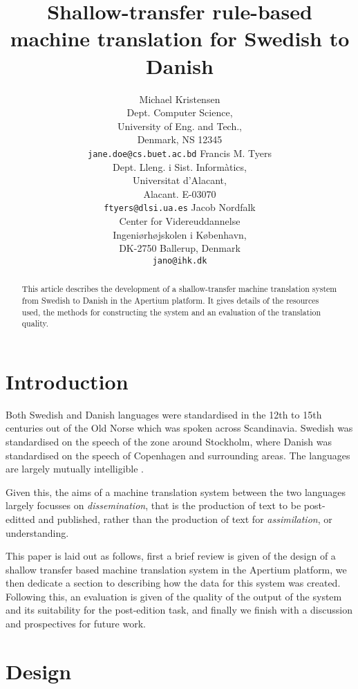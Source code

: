 \documentclass[11pt]{article}
\title{Shallow-transfer rule-based machine translation for Swedish to Danish}
\author{Michael Kristensen\\
  Dept. Computer Science, \\
  University of Eng. and Tech.,\\
  Denmark, NS 12345 \\
  {\tt jane.doe@cs.buet.ac.bd} \And
  Francis M. Tyers\\
  Dept. Lleng. i Sist. Informàtics, \\
  Universitat d'Alacant,\\
  Alacant. E-03070\\  
  {\tt ftyers@dlsi.ua.es} \And
  Jacob Nordfalk\\
  Center for Videreuddannelse\\
  Ingeniørhøjskolen i København,\\
  DK-2750 Ballerup, Denmark\\
  {\tt jano@ihk.dk}}
\date{}
\begin{document}
\maketitle

\begin{abstract}
  This article describes the development of a shallow-transfer machine translation
  system from Swedish to Danish in the Apertium platform. It gives details of the 
  resources used, the methods for constructing the system and an evaluation of the 
  translation quality.
\end{abstract}

\section{Introduction}

Both Swedish and Danish languages were standardised in the 12th to 15th centuries out
of the Old Norse which was spoken across Scandinavia. Swedish was standardised on the 
speech of the zone around Stockholm, where Danish was standardised on the speech of 
Copenhagen and surrounding areas. The languages are largely mutually intelligible \citep{Haugen1990}.

Given this, the aims of a machine translation system between the two languages largely
focusses on \emph{dissemination}, that is the production of text to be post-editted and 
published, rather than the production of text for \emph{assimilation}, or understanding.

This paper is laid out as follows, first a brief review is given of the design of a 
shallow transfer based machine translation system in the Apertium platform, we then 
dedicate a section to describing how the data for this system was created. Following this, 
an evaluation is given of the quality of the output of the system and its suitability 
for the post-edition task, and finally we finish with a discussion and prospectives 
for future work.


\section{Design}

\end{document}
